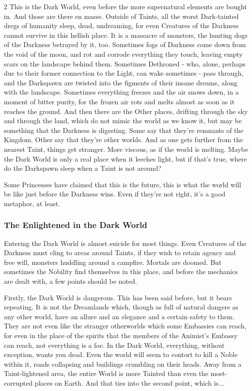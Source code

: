 \begin{multicols}{2}
This is the Dark World, even before the more supernatural elements are bought in. And those are there en masse. Outside of Taints, all the worst Dark-tainted dregs of humanity sleep, dead, undreaming, for even Creatures of the Darkness cannot survive in this hellish place. It is a massacre of monsters, the hunting dogs of the Darkness betrayed by it, too. Sometimes fogs of Darkness come down from the void of the moon, and rot and corrode everything they touch, leaving empty scars on the landscape behind them. Sometimes Dethroned - who, alone, perhaps due to their former connection to the Light, can wake sometimes - pass through, and the Darkspawn are twisted into the figments of their insane dreams, along with the landscape. Sometimes everything freezes and the air snows down, in a moment of bitter purity, for the frozen air rots and melts almost as soon as it reaches the ground. And then there are the Other places, drifting through the sky and through the land, which do not mimic the world as we know it, 
but may be something that the Darkness is digesting. Some say that they're remnants of the Kingdom. Other say that they're other worlds. And as one gets further from the nearest Taint, things get stranger. More viscous, as if the world is melting. Maybe the Dark World is only a real place when it leeches light, but if that's true, where do the Darkspawn sleep when a Taint is not around?

Some Princesses have claimed that this is the future, this is what the world will be like just before the Darkness wins. Even if they're not right, it's a good metaphor, at least. 

\subsubsection*{The Enlightened in the Dark World}

Entering the Dark World is almost suicide for most things. Even Creatures of the Darkness must cling to areas around Taints, if they wish to retain agency and free will, monsters huddling around a campfire. Mortals are doomed. But sometimes the Nobility find themselves in this place, and before the mechanics are dealt with, a few points should be noted.

Firstly, the Dark World is dangerous. This has been said before, but it bears repeating. It is not the Dreamlands which, though as full of natural dangers as any other world, have an allure and an elegance and a certain safety to them. They are not even like the stranger otherworlds which some Embassies can reach, for even in the place of the spirits that the members of the Animist's Embassy can reach, not everything is a foe. In the Dark World, everything, without exception, wants you dead. Even the world will seem to contort to kill a Noble within it, roads collapsing and buildings crumbling on their heads. Away from a Taint-lightened area, the entire World is more Tainted than even the most-corrupted places on Earth. And that ties into the second point, which is...


\end{multicols}
